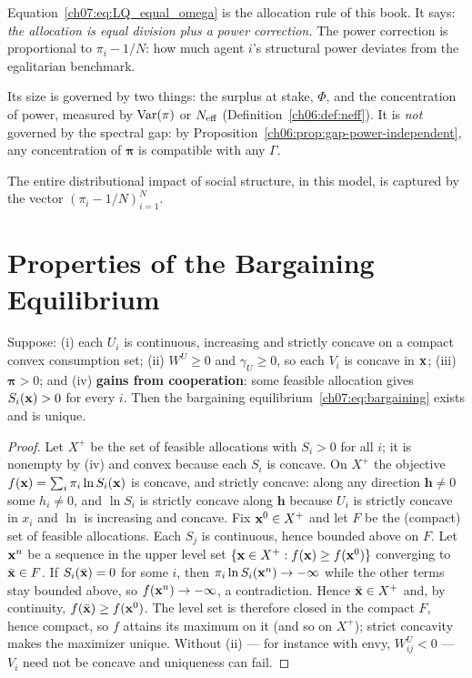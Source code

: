 \documentclass[../structural_economics_book.tex]{subfiles}
\begin{document}
\begin{keyinsight}
Equation~\eqref{ch07:eq:LQ_equal_omega} is the allocation rule of this book. It says: \textit{the allocation is equal division plus a power correction.} The power correction is proportional to $\pi_i - 1/N$: how much agent $i$'s structural power deviates from the egalitarian benchmark.

Its size is governed by two things: the surplus at stake, $\Phi$, and the concentration of power, measured by $\operatorname{Var}(\pi)$ or $N_{\text{eff}}$ (Definition~\ref{ch06:def:neff}). It is \textit{not} governed by the spectral gap: by Proposition~\ref{ch06:prop:gap-power-independent}, any concentration of $\boldsymbol{\pi}$ is compatible with any $\Gamma$.

The entire distributional impact of social structure, in this model, is captured by the vector $(\pi_i - 1/N)_{i=1}^N$.
\end{keyinsight}


\section{Properties of the Bargaining Equilibrium}
\label{ch07:sec:properties}

\begin{theorem}\label{ch07:thm:existence}
Suppose: (i) each $U_i$ is continuous, increasing and strictly concave on a compact convex consumption set; (ii) $W^U \geq 0$ and $\gamma_U \geq 0$, so each $V_i$ is concave in $\mathbf{x}$; (iii) $\boldsymbol{\pi} > 0$; and (iv) \textbf{gains from cooperation}: some feasible allocation gives $S_i(\mathbf{x}) > 0$ for every $i$. Then the bargaining equilibrium~\eqref{ch07:eq:bargaining} exists and is unique.
\end{theorem}

\begin{proof}
Let $X^+$ be the set of feasible allocations with $S_i > 0$ for all $i$; it is nonempty by (iv) and convex because each $S_i$ is concave. On $X^+$ the objective $f(\mathbf{x}) = \sum_i \pi_i \ln S_i(\mathbf{x})$ is concave, and strictly concave: along any direction $\mathbf{h} \neq 0$ some $h_i \neq 0$, and $\ln S_i$ is strictly concave along $\mathbf{h}$ because $U_i$ is strictly concave in $x_i$ and $\ln$ is increasing and concave. Fix $\mathbf{x}^0 \in X^+$ and let $F$ be the (compact) set of feasible allocations. Each $S_j$ is continuous, hence bounded above on $F$. Let $\mathbf{x}^n$ be a sequence in the upper level set $\{\mathbf{x} \in X^+ : f(\mathbf{x}) \geq f(\mathbf{x}^0)\}$ converging to $\bar{\mathbf{x}} \in F$. If $S_i(\bar{\mathbf{x}}) = 0$ for some $i$, then $\pi_i\ln S_i(\mathbf{x}^n) \to -\infty$ while the other terms stay bounded above, so $f(\mathbf{x}^n) \to -\infty$, a contradiction. Hence $\bar{\mathbf{x}} \in X^+$ and, by continuity, $f(\bar{\mathbf{x}}) \geq f(\mathbf{x}^0)$. The level set is therefore closed in the compact $F$, hence compact, so $f$ attains its maximum on it (and so on $X^+$); strict concavity makes the maximizer unique. Without (ii) --- for instance with envy, $W^U_{ij} < 0$ --- $V_i$ need not be concave and uniqueness can fail.
\end{proof}
\end{document}

